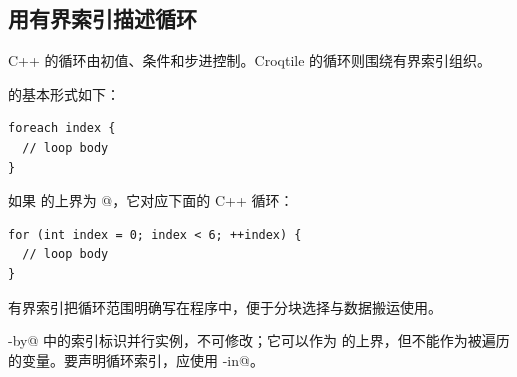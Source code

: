 \subsection*{用有界索引描述循环}

C++ 的循环由初值、条件和步进控制。Croqtile 的循环则围绕有界索引组织。

\co@foreach@ 的基本形式如下：

\begin{lstlisting}[language=croqtile,caption={一个 foreach 循环}]
foreach index {
  // loop body
}
\end{lstlisting}

如果 \co@index@ 的上界为 @，它对应下面的 C++ 循环：

\begin{lstlisting}[language=croqtile,caption={等价的 C++ 循环}]
for (int index = 0; index < 6; ++index) {
  // loop body
}
\end{lstlisting}

有界索引把循环范围明确写在程序中，便于分块选择与数据搬运使用。

\co@parallel-by@ 中的索引标识并行实例，不可修改；它可以作为 \co@foreach@ 的上界，但不能作为被遍历的变量。要声明循环索引，应使用 \co@with-in@。
